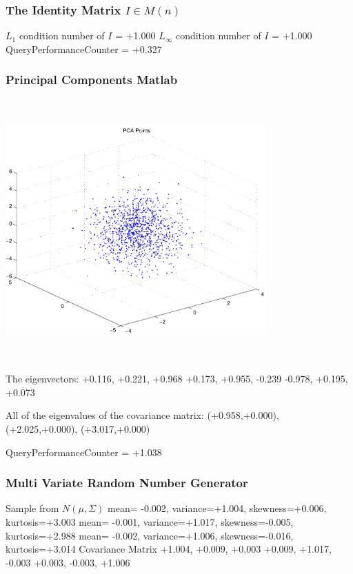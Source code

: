 \documentclass[9pt]{article}
\theoremstyle{plain}
\theoremstyle{definition}
\theoremstyle{remark}
\numberwithin{equation}{section}
\begin{document}
\subsubsection{The Identity Matrix $I \in M(n)$}
$L_1$ condition number of $I$ = +1.000
$L_\infty$ condition number of $I$ = +1.000
QueryPerformanceCounter  =  +0.327
\subsubsection{Principal Components Matlab }
\includegraphics[width=10.0cm,height=10.0cm]{PCAPoints.pdf}

The eigenvectors:
+0.116, +0.221, +0.968
+0.173, +0.955, -0.239
-0.978, +0.195, +0.073

All of the eigenvalues of the covariance matrix:
(+0.958,+0.000), (+2.025,+0.000), (+3.017,+0.000)

QueryPerformanceCounter  =  +1.038
\subsubsection{Multi Variate Random Number Generator }
Sample from $N(\mu,\Sigma)$
mean= -0.002, variance=+1.004, skewness=+0.006, kurtosis=+3.003
mean= -0.001, variance=+1.017, skewness=-0.005, kurtosis=+2.988
mean= -0.002, variance=+1.006, skewness=-0.016, kurtosis=+3.014
Covariance Matrix 
+1.004, +0.009, +0.003
+0.009, +1.017, -0.003
+0.003, -0.003, +1.006
\end{document}
